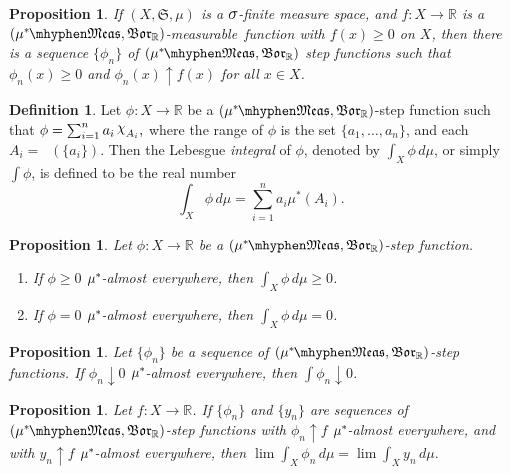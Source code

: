 \documentclass[
twoside=true,
paper=letter,
fontsize=9pt,
pagesize=auto,
leqno,
openany,
headsepline,
overfullrule,
]{scrbook}
\theoremstyle{plain}
\theoremstyle{plain}
\newtheorem{prop}[thm]{Proposition}
\theoremstyle{definition}
\newtheorem{defn}[thm]{Definition}
\theoremstyle{bfnoteitalic}
\theoremstyle{bfnoteroman}
\newcommand{\sigalg}[1]{\mathfrak{#1}}
\newcommand{\borel}{\mathfrak{Bor}}
\newcommand{\textsigma}{\hbox{\large{$\sigma$}}\kern-1pt}
\newcommand{\charfunction}[1]{\mathop{{\raisebox{2pt}{$\chi$}}_{#1}}}
\newcommand{\preimage}[1]{\mathop{#1^{\leftarrow}}}
\newcommand{\R}{\mathbb{R}}
\newcommand{\semiring}{\sigalg{S}}
\newcommand{\measurable}[1]{{#1}\mhyphen\mathfrak{Meas}}
\newcommand{\kernast}{\ast\kern-1pt}
\newcommand{\mbmeasurable}{$(\measurable{\measure^\kernast},\borel_\R)$\hyp{}measurable}
\newcommand{\measurespace}{X}
\newcommand{\mspaceeltii}{y}
\newcommand{\measure}{\mu}
\begin{document}
\begin{prop}\label{sigma_finite_step_functions}
If $(\measurespace, \semiring, \measure)$ is a $\textsigma$-finite measure space, and $f:\measurespace\to\R$ is a \mbmeasurable\ function with $f(x)\geq 0$ on $\measurespace$, 
then there is a sequence $\{\phi_n\}$ of $(\measurable{\measure^\kernast},\borel_\R)$ step functions such that $\phi_n(x)\geq 0$ and $\phi_n(x)\uparrow f(x)$ for all $x\in\measurespace$.
\end{prop}







\begin{defn}\label{integral_step_function}
Let $\phi:\measurespace\to\R$ be a $(\measurable{\measure^\kernast},\borel_\R)$-step function such that $\phi=\sum_{i=1}^{n}a_i\charfunction{A_i},$ where the range of $\phi$ is the set $\{a_1, \ldots, a_n\}$, and each $A_i=\preimage{\phi}(\{ a_i\} )$. Then the Lebesgue \emph{integral}  of $\phi$, denoted by $\int_\measurespace\phi\,d\measure$, or simply $\int \phi$,  is defined to be the real number
\[
\int_\measurespace\phi\,d\measure = \sum_{i=1}^{n}a_i\measure^*(A_i).
\]
\end{defn}


\begin{prop}
Let $\phi:\measurespace\to\R$ be a $(\measurable{\measure^\kernast},\borel_\R)$-step function.
\begin{enumerate}
\item
If $\phi \geq 0$ $\measure^\kernast$-almost everywhere, then 
$\int_\measurespace\phi\,d\measure \geq 0$.
\item
If $\phi = 0$ $\measure^\kernast$-almost everywhere, then 
$\int_\measurespace\phi\,d\measure = 0$.
\end{enumerate}
\end{prop}


\begin{prop}\label{continuity_at_zero}
Let $\{\phi_n\}$ be a sequence of $(\measurable{\measure^\kernast},\borel_\R)$-step functions.  If $\phi_n\downarrow 0$ $\measure^\kernast$-almost everywhere, then $\int \phi_n\downarrow 0$.
\end{prop}



\begin{prop}\label{integral_is_unique}
Let $f:\measurespace\to\R$. If $\{\phi_n\}$ and $\{\mspaceeltii_n\}$ are sequences of $(\measurable{\measure^\kernast},\borel_\R)$-step functions with 
$\phi_n\uparrow f$ $\measure^\kernast$-almost everywhere, and with 
$\mspaceeltii_n\uparrow f$ $\measure^\kernast$-almost everywhere,
then 
$\lim \int_\measurespace\phi_n\,d\measure 
=
\lim \int_\measurespace\mspaceeltii_n\,d\measure.$
\end{prop}
\end{document}
